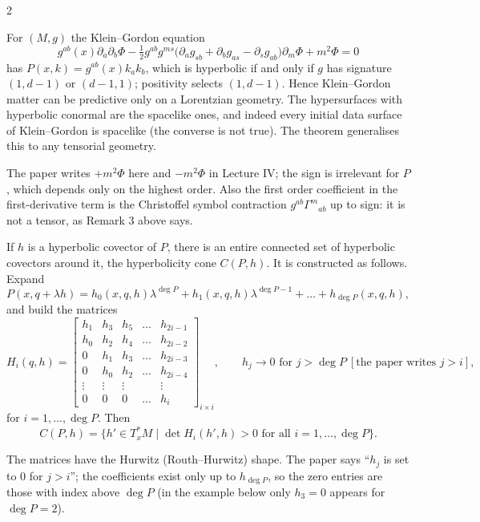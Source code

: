 \begin{paracol}{2}
\begin{example}\label{ex:c29-KG}
For $(M,g)$ the Klein--Gordon equation
\[
  g^{ab}(x)\partial_a\partial_b\Phi-\tfrac12g^{ab}g^{ms}\bigl(\partial_ag_{sb}+\partial_bg_{as}-\partial_sg_{ab}\bigr)\partial_m\Phi+m^2\Phi=0
\]
has $P(x,k)=g^{ab}(x)k_ak_b$, which is hyperbolic if and only if $g$ has signature $(1,d-1)$ or $(d-1,1)$; positivity selects $(1,d-1)$. Hence Klein--Gordon matter can be predictive only on a Lorentzian geometry. The hypersurfaces with hyperbolic conormal are the spacelike ones, and indeed every initial data surface of Klein--Gordon is spacelike (the converse is not true). The theorem generalises this to any tensorial geometry.
\end{example}
\begin{coursenote}
The paper writes $+m^2\Phi$ here and $-m^2\Phi$ in Lecture IV; the sign is irrelevant for $P$, which depends only on the highest order. Also the first order coefficient in the first-derivative term is the Christoffel symbol contraction $g^{ab}\Gamma^m{}_{ab}$ up to sign: it is not a tensor, as Remark 3 above says.
\end{coursenote}

\begin{definition}\label{def:c29-cone}
If $h$ is a hyperbolic covector of $P$, there is an entire connected set of hyperbolic covectors around it, the hyperbolicity cone $C(P,h)$. It is constructed as follows. Expand
\[
  P(x,q+\lambda h)=h_0(x,q,h)\lambda^{\deg P}+h_1(x,q,h)\lambda^{\deg P-1}+\dots+h_{\deg P}(x,q,h),
\]
and build the matrices
\[
  H_i(q,h)=\begin{bmatrix}
    h_1&h_3&h_5&\dots&h_{2i-1}\\
    h_0&h_2&h_4&\dots&h_{2i-2}\\
    0&h_1&h_3&\dots&h_{2i-3}\\
    0&h_0&h_2&\dots&h_{2i-4}\\
    \vdots&\vdots&\vdots&&\vdots\\
    0&0&0&\dots&h_i
  \end{bmatrix}_{i\times i},\qquad h_j\to0\text{ for }j>\deg P\ [\text{the paper writes }j>i],
\]
for $i=1,\dots,\deg P$. Then
\[
  C(P,h)=\{h'\in T^*_xM\mid\det H_i(h',h)>0\text{ for all }i=1,\dots,\deg P\}.
\]
\end{definition}
\begin{coursenote}
The matrices have the Hurwitz (Routh--Hurwitz) shape. The paper says ``$h_j$ is set to $0$ for $j>i$''; the coefficients exist only up to $h_{\deg P}$, so the zero entries are those with index above $\deg P$ (in the example below only $h_3=0$ appears for $\deg P=2$).
\end{coursenote}


\end{paracol}
